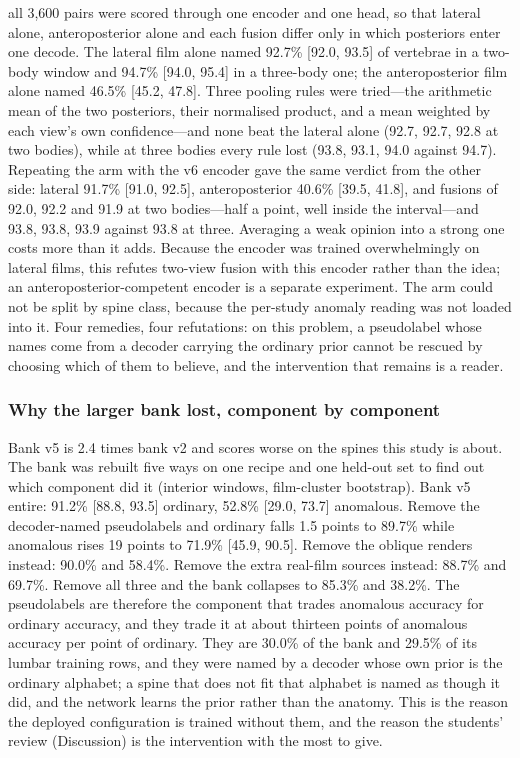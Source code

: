 \documentclass[11pt,letterpaper]{article}
\newcommand{\ci}[2]{[#1, #2]}
\begin{document}
all 3,600 pairs were scored through one encoder and one head, so that lateral alone, anteroposterior alone and each fusion differ only in which posteriors enter one decode. The lateral film alone named 92.7\% \ci{92.0}{93.5} of vertebrae in a two-body window and 94.7\% \ci{94.0}{95.4} in a three-body one; the anteroposterior film alone named 46.5\% \ci{45.2}{47.8}. Three pooling rules were tried---the arithmetic mean of the two posteriors, their normalised product, and a mean weighted by each view's own confidence---and none beat the lateral alone (92.7, 92.7, 92.8 at two bodies), while at three bodies every rule lost (93.8, 93.1, 94.0 against 94.7). Repeating the arm with the v6 encoder gave the same verdict from the other side: lateral 91.7\% \ci{91.0}{92.5}, anteroposterior 40.6\% \ci{39.5}{41.8}, and fusions of 92.0, 92.2 and 91.9 at two bodies---half a point, well inside the interval---and 93.8, 93.8, 93.9 against 93.8 at three. Averaging a weak opinion into a strong one costs more than it adds. Because the encoder was trained overwhelmingly on lateral films, this refutes two-view fusion with this encoder rather than the idea; an anteroposterior-competent encoder is a separate experiment. The arm could not be split by spine class, because the per-study anomaly reading was not loaded into it. Four remedies, four refutations: on this problem, a pseudolabel whose names come from a decoder carrying the ordinary prior cannot be rescued by choosing which of them to believe, and the intervention that remains is a reader.

\subsubsection*{Why the larger bank lost, component by component}
Bank v5 is 2.4 times bank v2 and scores worse on the spines this study is about. The bank was rebuilt five ways on one recipe and one held-out set to find out which component did it (interior windows, film-cluster bootstrap). Bank v5 entire: 91.2\% \ci{88.8}{93.5} ordinary, 52.8\% \ci{29.0}{73.7} anomalous. Remove the decoder-named pseudolabels and ordinary falls 1.5 points to 89.7\% while anomalous rises 19 points to 71.9\% \ci{45.9}{90.5}. Remove the oblique renders instead: 90.0\% and 58.4\%. Remove the extra real-film sources instead: 88.7\% and 69.7\%. Remove all three and the bank collapses to 85.3\% and 38.2\%. The pseudolabels are therefore the component that trades anomalous accuracy for ordinary accuracy, and they trade it at about thirteen points of anomalous accuracy per point of ordinary. They are 30.0\% of the bank and 29.5\% of its lumbar training rows, and they were named by a decoder whose own prior is the ordinary alphabet; a spine that does not fit that alphabet is named as though it did, and the network learns the prior rather than the anatomy. This is the reason the deployed configuration is trained without them, and the reason the students' review (Discussion) is the intervention with the most to give.
\end{document}
